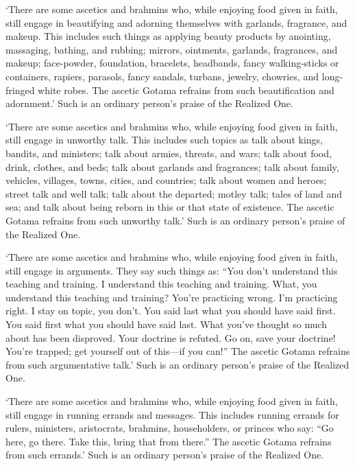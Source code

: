 \documentclass[12pt,openany]{book}%
\begin{document}
‘There are some ascetics and brahmins who, while enjoying food given in faith, still engage in beautifying and adorning themselves with garlands, fragrance, and makeup. This includes such things as applying beauty products by anointing, massaging, bathing, and rubbing; mirrors, ointments, garlands, fragrances, and makeup; face-powder, foundation, bracelets, headbands, fancy walking-sticks or containers, rapiers, parasols, fancy sandals, turbans, jewelry, chowries, and long-fringed white robes. The ascetic Gotama refrains from such beautification and adornment.’ Such is an ordinary person’s praise of the Realized One. 

‘There are some ascetics and brahmins who, while enjoying food given in faith, still engage in unworthy talk. This includes such topics as talk about kings, bandits, and ministers; talk about armies, threats, and wars; talk about food, drink, clothes, and beds; talk about garlands and fragrances; talk about family, vehicles, villages, towns, cities, and countries; talk about women and heroes; street talk and well talk; talk about the departed; motley talk; tales of land and sea; and talk about being reborn in this or that state of existence. The ascetic Gotama refrains from such unworthy talk.’ Such is an ordinary person’s praise of the Realized One. 

‘There are some ascetics and brahmins who, while enjoying food given in faith, still engage in arguments. They say such things as: “You don’t understand this teaching and training. I understand this teaching and training. What, you understand this teaching and training? You’re practicing wrong. I’m practicing right. I stay on topic, you don’t. You said last what you should have said first. You said first what you should have said last. What you’ve thought so much about has been disproved. Your doctrine is refuted. Go on, save your doctrine! You’re trapped; get yourself out of this—if you can!” The ascetic Gotama refrains from such argumentative talk.’ Such is an ordinary person’s praise of the Realized One. 

‘There are some ascetics and brahmins who, while enjoying food given in faith, still engage in running errands and messages. This includes running errands for rulers, ministers, aristocrats, brahmins, householders, or princes who say: “Go here, go there. Take this, bring that from there.” The ascetic Gotama refrains from such errands.’ Such is an ordinary person’s praise of the Realized One. 
\end{document}
